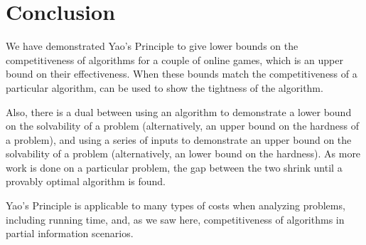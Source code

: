\section{Conclusion}
We have demonstrated Yao's Principle to give lower bounds on the competitiveness of algorithms for a couple of online games, which is an upper bound on their effectiveness. When these bounds match the competitiveness of a particular algorithm, can be used to show the tightness of the algorithm.

Also, there is a dual between using an algorithm to demonstrate a lower bound on the solvability of a problem (alternatively, an upper bound on the hardness of a problem), and using a series of inputs to demonstrate an upper bound on the solvability of a problem (alternatively, an lower bound on the hardness). As more work is done on a particular problem, the gap between the two shrink until a provably optimal algorithm is found.

Yao's Principle is applicable to many types of costs when analyzing problems, including running time, and, as we saw here, competitiveness of algorithms in partial information scenarios.
